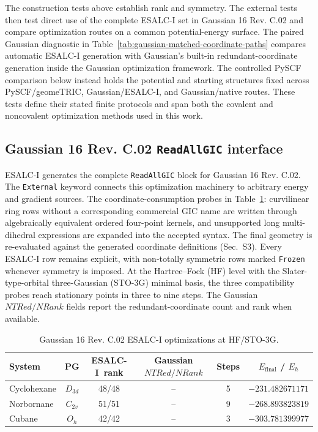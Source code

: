 \documentclass[10pt]{article}
\newcommand{\ESALCI}{ESALC-I}
\begin{document}
{The construction tests above establish rank and symmetry.  The external tests
then test direct use of the complete ESALC-I set in Gaussian 16 Rev. C.02
and compare optimization routes on a common potential-energy surface.  The
paired Gaussian diagnostic in
Table~\ref{tab:gaussian-matched-coordinate-paths} compares automatic ESALC-I
generation with Gaussian's built-in redundant-coordinate generation inside
the Gaussian optimization framework.  The controlled PySCF comparison below
instead holds the
potential and starting structures fixed across PySCF/geomeTRIC,
Gaussian/ESALC-I, and Gaussian/native routes.  These tests define
their stated finite protocols and span both the covalent and noncovalent
optimization methods used in this work.

\subsection{Gaussian 16 Rev. C.02 \texttt{ReadAllGIC} interface}

ESALC-I generates the complete \texttt{ReadAllGIC} block for
Gaussian 16 Rev. C.02. The \texttt{External} keyword connects this
optimization machinery to arbitrary energy and gradient sources.
The coordinate-consumption probes in
Table~\ref{tab:readallgic-opt}: curvilinear ring rows without a corresponding
commercial GIC name are written through algebraically equivalent ordered
four-point kernels, and unsupported long multi-dihedral expressions are
expanded into the accepted syntax.  The final geometry is re-evaluated against
the generated coordinate definitions (Sec.~S3).  Every ESALC-I row remains
explicit, with non-totally symmetric rows marked \texttt{Frozen} whenever
symmetry is imposed.  At the {Hartree--Fock (HF)} level with the
Slater-type-orbital three-Gaussian (STO-3G) minimal basis, the three compatibility probes reach
stationary points in three to nine steps.  {The Gaussian
\(NTRed/NRank\) fields report the redundant-coordinate count and rank when
available.}

\begin{table}[htbp]
\centering
\caption{{Gaussian 16 Rev. C.02 ESALC-I optimizations at
HF/STO-3G.}}
\label{tab:readallgic-opt}
\begin{tabular}{lccccc}
\toprule
System & PG & \ESALCI\ rank & Gaussian \(NTRed/NRank\) & Steps & \(E_\mathrm{final}\) / \(E_h\) \\
\midrule
Cyclohexane & \(D_{3d}\) & 48/48 & -- & 5 & \(-231.482671171\) \\
Norbornane & \(C_{2v}\) & 51/51 & -- & 9 & \(-268.893823819\) \\
Cubane & \(O_h\) & 42/42 & -- & 3 & \(-303.781399977\) \\
\bottomrule
\end{tabular}
\end{table}

}
\end{document}
